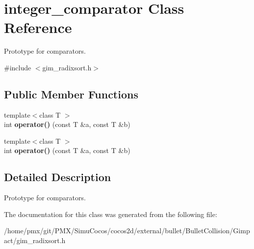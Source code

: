 \hypertarget{classinteger__comparator}{}\section{integer\+\_\+comparator Class Reference}
\label{classinteger__comparator}


Prototype for comparators.  




{\ttfamily \#include $<$gim\+\_\+radixsort.\+h$>$}

\subsection*{Public Member Functions}
\begin{DoxyCompactItemize}
\item 
\mbox{\label{classinteger__comparator_ae1d95017115b36674509a727067a331b}} 
{\footnotesize template$<$class T $>$ }\\int {\bfseries operator()} (const T \&a, const T \&b)
\item 
\mbox{\label{classinteger__comparator_ae1d95017115b36674509a727067a331b}} 
{\footnotesize template$<$class T $>$ }\\int {\bfseries operator()} (const T \&a, const T \&b)
\end{DoxyCompactItemize}


\subsection{Detailed Description}
Prototype for comparators. 

The documentation for this class was generated from the following file\+:\begin{DoxyCompactItemize}
\item 
/home/pmx/git/\+P\+M\+X/\+Simu\+Cocos/cocos2d/external/bullet/\+Bullet\+Collision/\+Gimpact/gim\+\_\+radixsort.\+h\end{DoxyCompactItemize}
